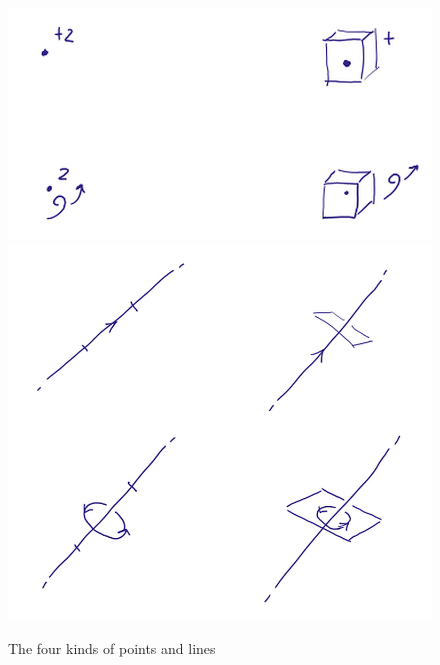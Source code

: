 \documentclass[\ifafour a4paper,12pt,\else a5paper,10pt,\fi%
onecolumn,oneside,article,%
british%
]{memoir}
\theoremstyle{remark}
\theoremstyle{innote}
\renewcommand*{\|}{\nonscript\,\vert\nonscript\;\mathopen{}}
\newcommand*{\+}{\boxplus}
\begin{document}
\begin{figure}[p!]%
 \centering\includegraphics[width=0.9\linewidth]{ex0b.png}\\[5em]\includegraphics[width=0.9\linewidth]{ex1b.png}%
\caption{The four kinds of points and lines}\label{fig:points_lines}
\end{figure}%
\end{document}
